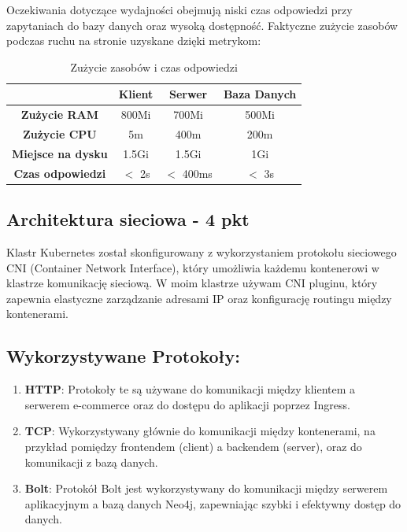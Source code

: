 \documentclass[12pt,a4paper]{article}
\begin{document}
Oczekiwania dotyczące wydajności obejmują niski czas odpowiedzi przy zapytaniach do bazy danych oraz wysoką dostępność. Faktyczne zużycie zasobów podczas ruchu na stronie uzyskane dzięki metrykom:
\begin{table}[h!]
\centering
\begin{tabular}{|c|c|c|c|}
\hline
 & \textbf{Klient} & \textbf{Serwer} & \textbf{Baza Danych} \\ \hline
\textbf{Zużycie RAM} & 800Mi & 700Mi & 500Mi \\ \hline
\textbf{Zużycie CPU} & 5m & 400m & 200m \\ \hline
\textbf{Miejsce na dysku} & 1.5Gi & 1.5Gi & 1Gi \\ \hline
\textbf{Czas odpowiedzi} & $<$ 2s & $<$ 400ms & $<$ 3s \\ \hline
\end{tabular}
\caption{Zużycie zasobów i czas odpowiedzi}
\label{table:zuzycie}
\end{table}


\subsection{Architektura sieciowa - 4 pkt}
Klastr Kubernetes został skonfigurowany z wykorzystaniem protokołu sieciowego CNI (Container Network Interface), który umożliwia każdemu kontenerowi w klastrze komunikację sieciową. W moim klastrze używam CNI pluginu, który zapewnia elastyczne zarządzanie adresami IP oraz konfigurację routingu między kontenerami.

\subsection*{Wykorzystywane Protokoły:}

\begin{enumerate}
    \item \textbf{HTTP}: Protokoły te są używane do komunikacji między klientem a serwerem e-commerce oraz do dostępu do aplikacji poprzez Ingress.
    
    \item \textbf{TCP}: Wykorzystywany głównie do komunikacji między kontenerami, na przykład pomiędzy frontendem (client) a backendem (server), oraz do komunikacji z bazą danych.
    
    \item \textbf{Bolt}: Protokół Bolt jest wykorzystywany do komunikacji między serwerem aplikacyjnym a bazą danych Neo4j, zapewniając szybki i efektywny dostęp do danych.
\end{enumerate}
\end{document}
